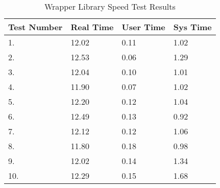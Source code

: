 \vspace{3em}
\renewcommand{\arraystretch}{1.5}

\begin{table}
\caption{Wrapper Library Speed Test Results}
\label{tb:wrapres}
\begin{center}
\begin{tabular}{| l | l | l | l |}
\hline
\textbf{Test Number} & \textbf{Real Time} & \textbf{User Time} & \textbf{Sys Time} \\ \hline
1. & 12.02		& 0.11 	&	1.02		\\ \hline
2. & 12.53 		& 0.06 	&	1.29	\\ \hline
3. & 12.04 		& 0.10 	&	1.01	\\ \hline
4. & 11.90 		& 0.07 	& 1.02				\\ \hline
5. & 12.20  	& 0.12 	& 1.04				\\ \hline
6. & 12.49  & 0.13 & 0.92 \\ \hline
7. & 12.12    & 0.12 & 1.06 \\ \hline
8. & 11.80  & 0.18 & 0.98  \\ \hline
9. & 12.02  & 0.14 & 1.34 \\ \hline
10. & 12.29    & 0.15  & 1.68 \\ \hline
\hline

\end{tabular}
\end{center}
\end{table}

\vspace{3em}
